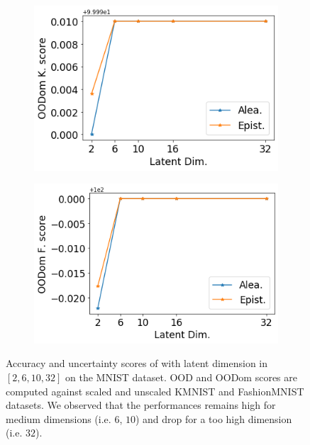 \begin{figure}[ht]
    \begin{subfigure}[t]{0.33 \textwidth}
        \centering
        \includegraphics[width=1. \textwidth]{sections/006_neurips2020/figures/lat_dim_minst_ood_3.png}
    \end{subfigure}%
    \begin{subfigure}[t]{0.33 \textwidth}
        \centering
        \includegraphics[width=1. \textwidth]{sections/006_neurips2020/figures/lat_dim_minst_ood_4.png}
    \end{subfigure}%

    \caption{Accuracy and uncertainty scores of \PostNetacro with latent dimension in $[2, 6, 10, 32]$ on the MNIST dataset. OOD and OODom scores are computed against scaled and unscaled KMNIST and FashionMNIST datasets. We observed that the performances remains high for medium dimensions (i.e. $6$, $10$) and drop for a too high dimension (i.e. $32$).}
    \label{fig:latent_dim_MNIST}
\end{figure}

